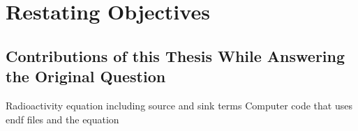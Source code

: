 \section{Restating Objectives}
 
\subsection{Contributions of this Thesis While Answering the Original Question}

Radioactivity equation including source and sink terms
Computer code that uses endf files and the equation





